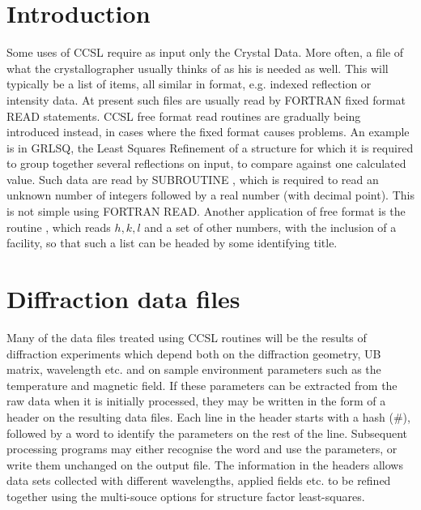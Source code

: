 %
\startdocument
%
\label{chap:4}
\section{Introduction}
Some uses of CCSL require as input only the Crystal Data.  More often, a
file of what the crystallographer usually thinks of as his 
is needed as well.  This will typically be a list of items, all similar in
format, e.g. indexed reflection or intensity data.\p
At present such files are usually read by FORTRAN fixed format READ
statements. CCSL free format read routines are gradually being
introduced instead, in cases where the fixed format causes problems. An
example is in GRLSQ, the Least Squares Refinement of a structure for
which it is required to group together several reflections on input, to
compare against one calculated value.  Such data are read by SUBROUTINE
, which is required to read an unknown number of integers followed
by a real number (with decimal point).  This is not simple using
FORTRAN READ.\p
Another application of free format is the routine , which reads 
$h,k,l$ and a set of other numbers, with the inclusion
of a  facility, so that such a list can be headed by some
identifying title.
\section{Diffraction data files}
Many of the data files treated using CCSL routines will be the results of
diffraction experiments which depend both on the diffraction
geometry, UB matrix, wavelength etc. and on sample environment parameters
such as the temperature and magnetic field. If these parameters can be extracted
from the raw data when it is initially processed, they may be written in the form of a header on the resulting data files. Each line in the header starts with a hash (\#),
followed by a word to identify the parameters on the rest of the line. Subsequent
processing programs may either recognise the word and use the parameters, or write them
unchanged on the output file. The information in the headers allows data sets
collected with different wavelengths, applied fields etc. to be refined
together using the multi-souce options for structure factor least-squares.
%
